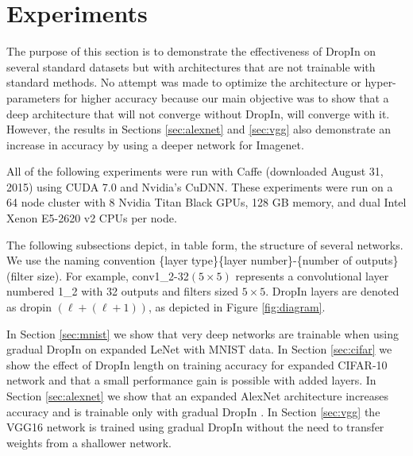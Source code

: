 \documentclass[10pt,twocolumn,letterpaper]{article}
\newcommand{\dropin}{DropIn }
\newcommand{\dropinNS}{DropIn}
\begin{document}

\section{Experiments}
\label{sec:experiments}

The purpose of this section is to demonstrate the effectiveness of \dropin on several standard datasets but with  architectures that are not trainable with standard methods.
No attempt was made to optimize the architecture or hyper-parameters for higher accuracy because our main objective was to show that a deep architecture that will not converge without \dropinNS, will converge with it.
However, the results in Sections  \ref{sec:alexnet} and \ref{sec:vgg}  also demonstrate an increase in accuracy by using a deeper network for Imagenet.

All of the following experiments were run with Caffe (downloaded August 31, 2015) using CUDA 7.0 and Nvidia's CuDNN.  
These experiments were run on a 64 node cluster with 8 Nvidia Titan Black GPUs, 128 GB memory, and dual Intel Xenon E5-2620 v2 CPUs per node.  

The following subsections depict, in table form, the structure of several networks.  We use the naming convention \{layer type\}\{layer number\}-\{number of outputs\}(filter size).  
For example, conv1\_2-32$(5\times 5)$ represents a convolutional layer numbered 1\_2 with 32 outputs and filters sized $5\times 5$.  
\dropin layers are denoted as dropin $(\ell + (\ell + 1))$, as depicted in Figure \ref{fig:diagram}.

In Section \ref{sec:mnist} we show that very deep networks are trainable when using gradual \dropin on expanded LeNet with MNIST data.  In Section \ref{sec:cifar} we show the effect of \dropin length on training accuracy for expanded CIFAR-10 network and that a small performance gain is possible with added layers.
In Section \ref{sec:alexnet} we show that an expanded AlexNet architecture increases accuracy and is trainable only with gradual \dropin.  
In Section \ref{sec:vgg} the VGG16 network is trained using gradual \dropin without the need to transfer weights from a shallower network.  
\end{document}
